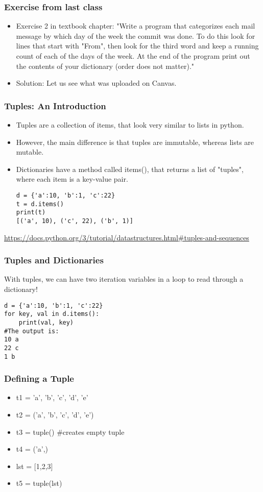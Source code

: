 \documentclass{beamer}
\begin{document}
\begin{frame}
\frametitle{Exercise from last class}
\begin{itemize}
\item Exercise 2 in textbook chapter: "Write a program that categorizes each mail message by which day of the week the commit was done. To do this look for lines that start with "From", then look for the third word and keep a running count of each of the days of the week. At the end of the program print out the contents of your dictionary (order does not matter)." 
\item Solution: Let us see what was uploaded on Canvas. 
\end{itemize}
\end{frame}

\begin{frame}[fragile] %
\frametitle{Tuples: An Introduction}
\begin{itemize}
\item Tuples are a collection of items, that look very similar to lists in python.
\item However, the main difference is that tuples are immutable, whereas lists are mutable.
\item Dictionaries have a method called items(), that returns a list of "tuples", where each item is a key-value pair.
\begin{verbatim}
d = {'a':10, 'b':1, 'c':22}
t = d.items()
print(t)
[('a', 10), ('c', 22), ('b', 1)]
\end{verbatim}
\end{itemize} \tiny
\url{https://docs.python.org/3/tutorial/datastructures.html#tuples-and-sequences}
\end{frame} 

\begin{frame}[fragile]
\frametitle{Tuples and Dictionaries}
With tuples, we can have two iteration variables in a loop to read through a dictionary!
\begin{verbatim}
d = {'a':10, 'b':1, 'c':22}
for key, val in d.items():
    print(val, key)
#The output is:
10 a
22 c
1 b
\end{verbatim}
\end{frame}

\begin{frame}[fragile]
\frametitle{Defining a Tuple}
\begin{itemize}
\item t1 = 'a', 'b', 'c', 'd', 'e'
\item t2 = ('a', 'b', 'c', 'd', 'e')
\item t3 = tuple() \#creates empty tuple
\item t4 = ('a',)
\item lst = [1,2,3]
\item t5 = tuple(lst)
\end{itemize}
\end{frame}
\end{document}
